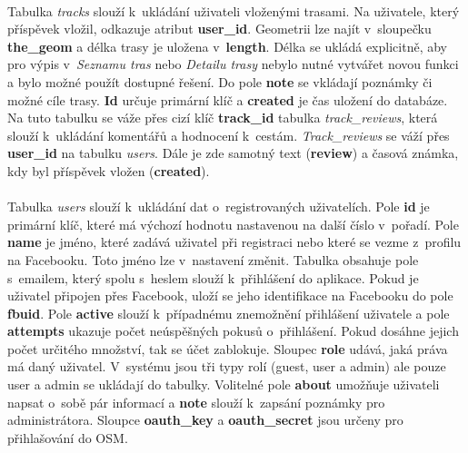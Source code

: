 \documentclass[11pt,a4paper,titlepage,oneside]{book}
\begin{document}

			\paragraph{} Tabulka \textit{tracks} slouží k~ukládání uživateli vloženými trasami. Na uživatele, který příspěvek vložil, odkazuje atribut \textbf{user\_id}. Geometrii lze najít v~sloupečku \textbf{the\_geom} a délka trasy je uložena v~\textbf{length}. Délka se ukládá explicitně, aby pro výpis v~\textit{Seznamu tras} nebo \textit{Detailu trasy} nebylo nutné vytvářet novou funkci a bylo možné použít dostupné řešení.  Do pole \textbf{note} se vkládají poznámky či možné cíle trasy. \textbf{Id} určuje primární klíč a \textbf{created} je čas uložení do databáze. Na tuto tabulku se váže přes cizí klíč \textbf{track\_id} tabulka \textit{track\_reviews}, která slouží k~ukládání komentářů a hodnocení k~cestám. \textit{Track\_reviews} se váží přes \textbf{user\_id} na tabulku \textit{users}. Dále je zde samotný text (\textbf{review}) a časová známka, kdy byl příspěvek vložen (\textbf{created}).
			\paragraph{}\label{par:users}Tabulka \textit{users} slouží k~ukládání dat o~registrovaných uživatelích. Pole \textbf{id} je primární klíč, které má výchozí hodnotu nastavenou na další číslo v~pořadí. Pole \textbf{name} je jméno, které zadává uživatel při registraci nebo které se vezme z~profilu na Facebooku. Toto jméno lze v~nastavení změnit. Tabulka obsahuje pole s~emailem, který spolu s~heslem slouží k~přihlášení do aplikace. Pokud je uživatel připojen přes Facebook, uloží se jeho identifikace na Facebooku do pole \textbf{fbuid}. Pole \textbf{active} slouží k~případnému znemožnění přihlášení uživatele a pole \textbf{attempts} ukazuje počet neúspěšných pokusů o~přihlášení. Pokud dosáhne jejich počet určitého množství, tak se účet zablokuje. Sloupec \textbf{role} udává, jaká práva má daný uživatel. V~systému jsou tři typy rolí (guest, user a admin) ale pouze user a admin se ukládají do tabulky. Volitelné pole \textbf{about} umožňuje uživateli napsat o~sobě pár informací a \textbf{note} slouží k~zapsání poznámky pro administrátora. Sloupce \textbf{oauth\_key} a \textbf{oauth\_secret} jsou určeny pro přihlašování do \acl{OSM}.
\end{document}
